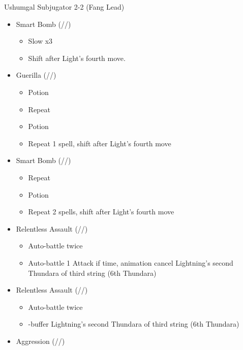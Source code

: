 \begin{paracol}{2}
	\renewcommand{\first}{[1] Aggression (\com/\com/\rav)}
	\renewcommand{\second}{[2] Relentless Assault (\com/\rav/\rav)}
	\renewcommand{\third}{[3] Smart Bomb (\sab/\rav/\rav)}
	\renewcommand{\fourth}{[4] Mystic Tower (\sen/\rav/\rav)}
	\renewcommand{\fifth}{[5] Guerilla (\sab/\rav/\syn)}
	\renewcommand{\sixth}{[6] Relentless Assault (\com/\rav/\rav)}
	\switchcolumn*
	\begin{battle}{Ushumgal Subjugator 2-2 (Fang Lead)}
		\begin{itemize}
			\item \third
			      \begin{itemize}
				      \item Slow x3
				      \item Shift after Light's fourth move.
			      \end{itemize}
			\item \fifth
			      \begin{itemize}
				      \item Potion
				      \item Repeat
				      \item Potion
				      \item Repeat 1 spell, shift after Light's fourth move
			      \end{itemize}
			\item \third
			      \begin{itemize}
				      \item Repeat
				      \item Potion
				      \item Repeat 2 spells, shift after Light's fourth move
			      \end{itemize}
			\item \second
			      \begin{itemize}
				      \item Auto-battle twice
				      \item Auto-battle 1 Attack if time, animation cancel Lightning's second Thundara of third string (6th Thundara)
			      \end{itemize}
			\item \sixth
			      \begin{itemize}
				      \item Auto-battle twice
				      \item \com-buffer Lightning's second Thundara of third string (6th Thundara)
			      \end{itemize}
			\item \first

\end{itemize}
\end{battle}
\end{paracol}
